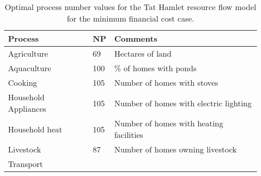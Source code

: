\begin{table}[h]
	\centering
	\caption{Optimal process number values for the Tat Hamlet resource flow model for the minimum financial cost case.} \label{tab:tat_basic_NP_results}
	\begin{tabular}{lll}
		\toprule
		Process  & NP & Comments \\
		\midrule
		Agriculture & 69 & Hectares of land \\
		Aquaculture & 100 & \% of homes with ponds \\
		Cooking & 105 & Number of homes with stoves \\
		Household Appliances & 105 & Number of homes with electric lighting \\
		Household heat & 105 & Number of homes with heating facilities \\
		Livestock & 87 & Number of homes owning livestock \\
		Transport & & \\
		\bottomrule
	\end{tabular}
\end{table}

